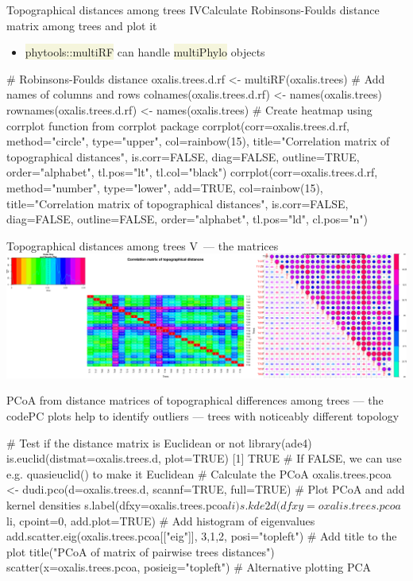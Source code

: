 \documentclass[compress, ucs, xelatex, 11pt, xcolor=svgnames, aspectratio=169,
	hyperref={
		bookmarks=true,
		unicode=true,
		colorlinks=true,
		pdftitle={Molecular data in R},
		plainpages=false,
		pdfauthor={Vojtech Zeisek},
		pdfsubject={Course about phylogeny and evolution in R},
		pdfcreator={XeLaTeX},
		pdfkeywords={R, evolution, phylogeny, molecular data},
		linkcolor=Crimson, %
		anchorcolor=Magenta, %
		citecolor=Magenta, %
		filecolor=Magenta, %
		menucolor=Magenta, %
		urlcolor=DodgerBlue, %
		pdftex},
	url={hyphens, lowtilde} %
	]{beamer}
\renewcommand{\texttt}[1]{\colorbox{Beige}{{\ttfamily #1}}}
\begin{document}
\begin{frame}[fragile]{Topographical distances among trees IV}{Calculate Robinsons-Foulds distance matrix among trees and plot it}
	\begin{itemize}
		\item \texttt{phytools::multiRF} can handle \texttt{multiPhylo} objects
	\end{itemize}
	\begin{spluscode}
    # Robinsons-Foulds distance
    oxalis.trees.d.rf <- multiRF(oxalis.trees)
    # Add names of columns and rows
    colnames(oxalis.trees.d.rf) <- names(oxalis.trees)
    rownames(oxalis.trees.d.rf) <- names(oxalis.trees)
    # Create heatmap using corrplot function from corrplot package
    corrplot(corr=oxalis.trees.d.rf, method="circle", type="upper",
      col=rainbow(15), title="Correlation matrix of topographical
      distances", is.corr=FALSE, diag=FALSE, outline=TRUE,
      order="alphabet", tl.pos="lt", tl.col="black")
    corrplot(corr=oxalis.trees.d.rf, method="number", type="lower",
      add=TRUE, col=rainbow(15), title="Correlation matrix of
      topographical distances", is.corr=FALSE, diag=FALSE,
      outline=FALSE, order="alphabet", tl.pos="ld", cl.pos="n")
	\end{spluscode}
\end{frame}

\begin{frame}{Topographical distances among trees V~--- the matrices}
	\includegraphics[width=\textwidth]{oxalis-dist.png}
\end{frame}

\begin{frame}[fragile]{PCoA from distance matrices of topographical differences among trees --- the code}{PC plots help to identify outliers --- trees with noticeably different topology}
	\begin{spluscode}
    # Test if the distance matrix is Euclidean or not
    library(ade4)
    is.euclid(distmat=oxalis.trees.d, plot=TRUE)
    [1] TRUE # If FALSE, we can use e.g. quasieuclid() to make it Euclidean
    # Calculate the PCoA
    oxalis.trees.pcoa <- dudi.pco(d=oxalis.trees.d, scannf=TRUE, full=TRUE)
    # Plot PCoA and add kernel densities
    s.label(dfxy=oxalis.trees.pcoa$li)
    s.kde2d(dfxy=oxalis.trees.pcoa$li, cpoint=0, add.plot=TRUE)
    # Add histogram of eigenvalues
    add.scatter.eig(oxalis.trees.pcoa[["eig"]], 3,1,2, posi="topleft")
    # Add title to the plot
    title("PCoA of matrix of pairwise trees distances")
    scatter(x=oxalis.trees.pcoa, posieig="topleft") # Alternative plotting PCA
	\end{spluscode}
\end{frame}
\end{document}
